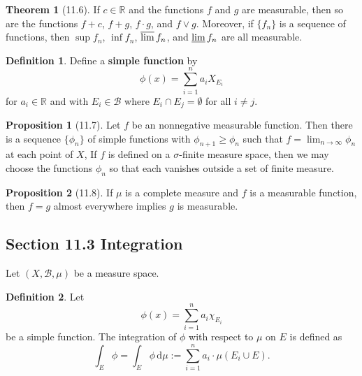 \documentclass[12pt]{article}
\newcommand{\R}{\mathbb{R}}
\newcommand{\B}{\mathcal{B}}
\newcommand{\dif}{\, \mathrm{d}}
\theoremstyle{definition}
\newtheorem*{thm}{Theorem}
\newtheorem*{definition}{Definition}
\newtheorem*{prop}{Proposition}
\begin{document}
\begin{thm}[11.6]

  If \( c \in \R \) and the functions \( f \) and \( g \) are measurable, then so are the functions \( f + c \), \( f + g \), \( f \cdot g \), and \( f \lor g \).
  Moreover, if \( \{f_n\} \) is a sequence of functions, then \( \sup f_n \), \( \inf f_n \), \( \varlimsup f_n \), and \( \varliminf f_n \) are all measurable.

\end{thm}

\begin{definition}
  Define a \textbf{simple function} by 
    \[
        \phi(x) = \sum_{i=1}^{n} a_i X_{E_{i}}
    \]
  for \( a_i \in \R \) and with \( E_i \in \B \) where \( E_i \cap E_j  = \emptyset \) for all \( i \neq j \).
\end{definition}


\begin{prop}[11.7]

  Let \( f \) be an nonnegative measurable function. 
  Then there is a sequence \( \{\phi_n\} \) of simple functions with \( \phi_{n+1} \geq \phi_n \) such that \( \displaystyle f = \lim_{n \to \infty} \phi_n \) at each point of \( X \), If \( f \) is defined on a  \( \sigma \)-finite measure space, then we may choose the functions \( \phi_n \) so that each vanishes outside a set of finite measure. 

\end{prop}

\begin{prop}[11.8]

  If \( \mu \) is a complete measure and \( f \) is a measurable function, then \( f = g \) almost everywhere implies \( g \) is measurable. 
  
\end{prop}

\subsection*{Section 11.3 Integration}

Let \( (X, \B, \mu) \) be a measure space.


\begin{definition}

  Let
    \[
        \phi(x) = \sum_{i=1}^{n} a_i \chi_{E_{i}}
    \]
  be a simple function. The integration of \( \phi \) with respect to \( \mu \) on \( E \) is defined as 
    \[
        \int_{E} \phi = \int_{E}  \phi \dif \mu := \sum_{i=1}^{n} a_i \cdot \mu \left( E_i \cup E \right).
    \]
\end{definition}
\end{document}
